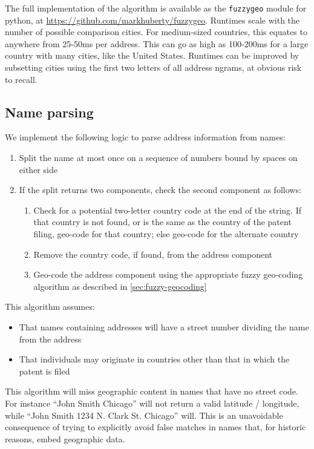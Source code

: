 \documentclass[11pt]{article}
\begin{document}
The full implementation of the algorithm is available as the
\texttt{fuzzygeo} module for python, at
\url{https://github.com/markhuberty/fuzzygeo}. Runtimes scale with the
number of possible comparison cities. For medium-sized
countries, this equates to anywhere from 25-50ms per address. This can
go as high as 100-200ms for a large country with many cities, like the
United States. Runtimes can be improved by subsetting cities using the
first two letters of all address ngrams, at obvious risk to
recall. 

\subsection{Name parsing}
\label{sec:name-parsing}

We implement the following logic to parse address information from
names:
\begin{enumerate}
\item Split the name at most once on a sequence of numbers bound by
  spaces on either side
\item If the split returns two components, check the second component
  as follows:
  \begin{enumerate}
  \item Check for a potential two-letter country code at the end of
    the string. If that country is not found, or is the same as the
    country of the patent filing, geo-code for that country; else
    geo-code for the alternate country
  \item Remove the country code, if found, from the address component
  \item Geo-code the address component using the appropriate fuzzy
    geo-coding algorithm as described in \ref{sec:fuzzy-geocoding} 
  \end{enumerate}
\end{enumerate}

This algorithm assumes:
\begin{itemize}
\item That names containing addresses will have a street number
  dividing the name from the address
\item That individuals may originate in countries other than that
  in which the patent is filed
\end{itemize}

This algorithm will miss geographic content in names that have no
street code. For instance ``John Smith Chicago'' will not return a
valid latitude / longitude, while ``John Smith 1234 N. Clark
St. Chicago'' will. This is an unavoidable consequence of trying to
explicitly avoid false matches in names that, for historic reasons,
embed geographic data. 
\end{document}
